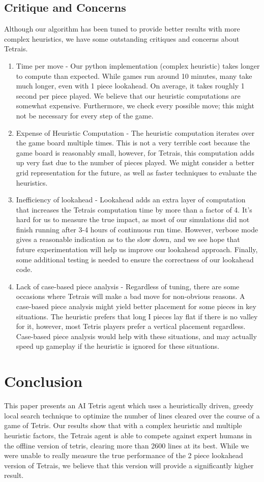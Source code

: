 \documentclass[12pt]{article}
\begin{document}
\subsection{Critique and Concerns}
Although our algorithm has been tuned to provide better results with more complex heuristics, we have some outstanding critiques and concerns about Tetrais.
\begin{enumerate}
\item Time per move - Our python implementation (complex heuristic) takes longer to compute than expected. While games run around 10 minutes, many take much longer, even with 1 piece lookahead. On average, it takes roughly 1 second per piece played. We believe that our heuristic computations are somewhat expensive. Furthermore, we check every possible move; this might not be necessary for every step of the game.
\item Expense of Heuristic Computation - The heuristic computation iterates over the game board multiple times. This is not a very terrible cost because the game board is reasonably small, however, for Tetrais, this computation adds up very fast due to the number of pieces played. We might consider a better grid representation for the future, as well as faster techniques to evaluate the heuristics.
\item Inefficiency of lookahead - Lookahead adds an extra layer of computation that increases the Tetrais computation time by more than a factor of 4. It’s hard for us to measure the true impact, as most of our simulations did not finish running after 3-4 hours of continuous run time. However, verbose mode gives a reasonable indication as to the slow down, and we see hope that future experimentation will help us improve our lookahead approach. Finally, some additional testing is needed to ensure the correctness of our lookahead code.
\item Lack of case-based piece analysis - Regardless of tuning, there are some occasions where Tetrais will make a bad move for non-obvious reasons. A case-based piece analysis might yield better placement for some pieces in key situations. The heuristic prefers that long I pieces lay flat if there is no valley for it, however, most Tetris players prefer a vertical placement regardless. Case-based piece analysis would help with these situations, and may actually speed up gameplay if the heuristic is ignored for these situations.
\end{enumerate}

\section{Conclusion}
This paper presents an AI Tetris agent which uses a heuristically driven, greedy local search technique to optimize the number of lines cleared over the course of a game of Tetris. Our results show that with a complex heuristic and multiple heuristic factors, the Tetrais agent is able to compete against expert humans in the offline version of tetris, clearing more than 2600 lines at its best. While we were unable to really measure the true performance of the 2 piece lookahead version of Tetrais, we believe that this version will provide a significantly higher result. 
\end{document}
